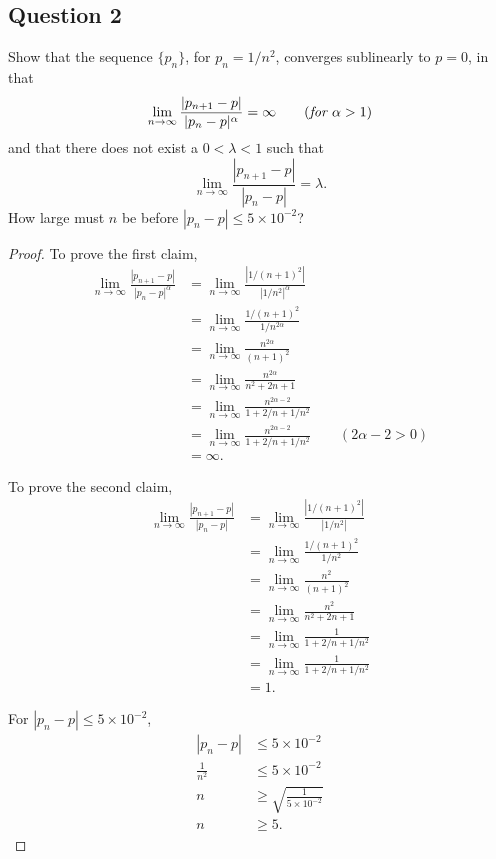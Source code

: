 \documentclass{article}
\begin{document}
\subsection*{Question 2}
Show that the sequence $\{p_n\}$, for $p_n=1/n^2$, converges sublinearly to $p=0$, in that 
$$\lim_{n\rightarrow\infty}\frac{|p_{n+1}-p|}{|p_n-p|^\alpha}=\infty \qquad (\emph{for }\alpha >1)$$
and that there does not exist a $0<\lambda<1$ such that 
$$\lim_{n\rightarrow\infty}\frac{|p_{n+1}-p|}{|p_n-p|}=\lambda.$$
How large must $n$ be before $|p_n-p|\le 5\times 10^{-2}$?
\begin{proof}
    To prove the first claim,
    \begin{align*}
        \lim_{n\rightarrow\infty}\frac{|p_{n+1}-p|}{|p_n-p|^\alpha} & = 
        \lim_{n\rightarrow\infty}\frac{|1/(n+1)^2|}{|1/n^2|^\alpha} \\
        & = \lim_{n\rightarrow\infty}\frac{1/(n+1)^2}{1/n^{2\alpha}} \\
        & = \lim_{n\rightarrow\infty}\frac{n^{2\alpha}}{(n+1)^2} \\
        & = \lim_{n\rightarrow\infty}\frac{n^{2\alpha}}{n^2 + 2n + 1} \\
        & = \lim_{n\rightarrow\infty}\frac{n^{2\alpha-2}}{1 + 2/n + 1/n^2} \\
        & = \lim_{n\rightarrow\infty}\frac{n^{2\alpha-2}}{1 + 2/n + 1/n^2} \qquad (2\alpha-2 > 0) \\
        & = \infty.
    \end{align*}
    
    To prove the second claim, 
    \begin{align*}
        \lim_{n\rightarrow\infty}\frac{|p_{n+1}-p|}{|p_n-p|} & = 
        \lim_{n\rightarrow\infty}\frac{|1/(n+1)^2|}{|1/n^2|} \\
        & = \lim_{n\rightarrow\infty}\frac{1/(n+1)^2}{1/n^{2}} \\
        & = \lim_{n\rightarrow\infty}\frac{n^{2}}{(n+1)^2} \\
        & = \lim_{n\rightarrow\infty}\frac{n^{2}}{n^2 + 2n + 1} \\
        & = \lim_{n\rightarrow\infty}\frac{1}{1 + 2/n + 1/n^2} \\
        & = \lim_{n\rightarrow\infty}\frac{1}{1 + 2/n + 1/n^2} \\
        & = 1. 
    \end{align*}

    For $|p_n-p|\le 5\times 10^{-2}$,
    \begin{align*}
        |p_n-p| & \le 5\times 10^{-2} \\
        \frac{1}{n^2} & \le 5\times 10^{-2} \\
        n & \ge \sqrt{\frac{1}{5\times 10^{-2}}} \\
        n & \ge 5.
    \end{align*}
\end{proof}
\end{document}
